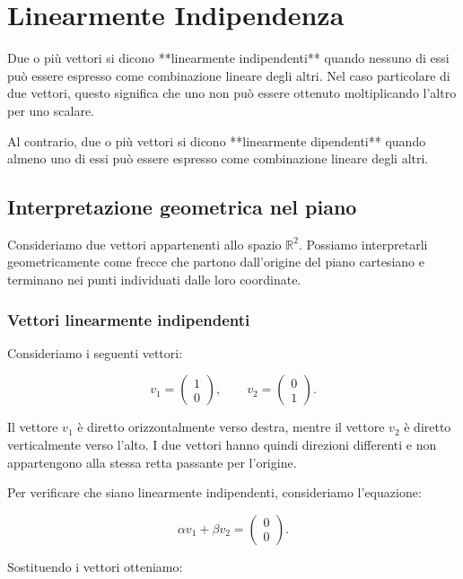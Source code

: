  \section{Linearmente Indipendenza}

Due o più vettori si dicono **linearmente indipendenti** quando nessuno di essi può essere espresso come combinazione lineare degli altri. Nel caso particolare di due vettori, questo significa che uno non può essere ottenuto moltiplicando l'altro per uno scalare.

Al contrario, due o più vettori si dicono **linearmente dipendenti** quando almeno uno di essi può essere espresso come combinazione lineare degli altri.

\subsection{Interpretazione geometrica nel piano}

Consideriamo due vettori appartenenti allo spazio \(\mathbb{R}^2\). Possiamo interpretarli geometricamente come frecce che partono dall'origine del piano cartesiano e terminano nei punti individuati dalle loro coordinate.

\subsubsection{Vettori linearmente indipendenti}

Consideriamo i seguenti vettori:

\[
v_1 =
\begin{pmatrix}
1\\
0
\end{pmatrix},
\qquad
v_2 =
\begin{pmatrix}
0\\
1
\end{pmatrix}.
\]

Il vettore \(v_1\) è diretto orizzontalmente verso destra, mentre il vettore \(v_2\) è diretto verticalmente verso l'alto. I due vettori hanno quindi direzioni differenti e non appartengono alla stessa retta passante per l'origine.

Per verificare che siano linearmente indipendenti, consideriamo l'equazione:

\[
\alpha v_1+\beta v_2=
\begin{pmatrix}
0\\
0
\end{pmatrix}.
\]

Sostituendo i vettori otteniamo:


